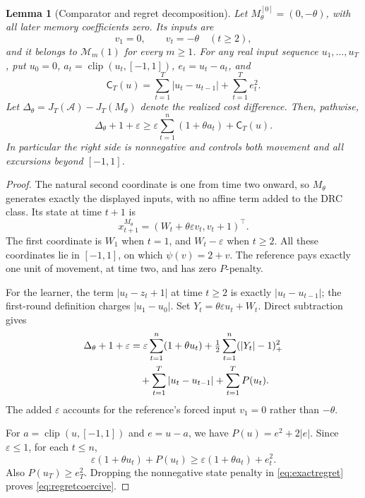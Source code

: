 \documentclass[11pt]{article}
\newtheorem{lemma}[theorem]{Lemma}
\theoremstyle{remark}
\newcommand{\clip}{\operatorname{clip}}
\newcommand{\cost}{\mathsf C}
\begin{document}
\begin{samepage}
\begin{lemma}[Comparator and regret decomposition]\label{lem:regret}
Let $M_\theta^{[0]}=(0,-\theta)$, with all later memory coefficients zero. Its inputs are
\[
 v_1=0,\qquad v_t=-\theta\quad(t\ge2),
\]
and it belongs to $\mathcal M_m(1)$ for every $m\ge1$. For any real input sequence $u_1,\ldots,u_T$, put $u_0=0$, $a_t=\clip(u_t,[-1,1])$, $e_t=u_t-a_t$, and
\[
 \cost_T(u)=\sum_{t=1}^T|u_t-u_{t-1}|+\sum_{t=1}^T e_t^2.
\]
Let $\Delta_\theta=J_T(\mathcal A)-J_T(M_\theta)$ denote the realized cost difference. Then, pathwise,
\begin{equation}\label{eq:regretcoercive}
 \Delta_\theta+1+\varepsilon
 \ge \varepsilon\sum_{t=1}^n(1+\theta a_t)+\cost_T(u).
\end{equation}
In particular the right side is nonnegative and controls both movement and all excursions beyond $[-1,1]$.
\end{lemma}
\end{samepage}
\begin{proof}
The natural second coordinate is one from time two onward, so $M_\theta$ generates exactly the displayed inputs, with no affine term added to the DRC class. Its state at time $t+1$ is
\[
 x_{t+1}^{M_\theta}=(W_t+\theta\varepsilon v_t,v_t+1)^\top.
\]
The first coordinate is $W_1$ when $t=1$, and $W_t-\varepsilon$ when $t\ge2$. All these coordinates lie in $[-1,1]$, on which $\psi(v)=2+v$. The reference pays exactly one unit of movement, at time two, and has zero $P$-penalty.

For the learner, the term $|u_t-z_t+1|$ at time $t\ge2$ is exactly $|u_t-u_{t-1}|$; the first-round definition charges $|u_1-u_0|$. Set $Y_t=\theta\varepsilon u_t+W_t$. Direct subtraction gives
\begin{align}
 \Delta_\theta+1+\varepsilon
 &=\varepsilon\sum_{t=1}^n(1+\theta u_t)
   +\tfrac12\sum_{t=1}^n(|Y_t|-1)_+^2\notag\\
 &\quad+\sum_{t=1}^T|u_t-u_{t-1}|+\sum_{t=1}^T P(u_t).
 \label{eq:exactregret}
\end{align}
The added $\varepsilon$ accounts for the reference's forced input $v_1=0$ rather than $-\theta$.

For $a=\clip(u,[-1,1])$ and $e=u-a$, we have $P(u)=e^2+2|e|$. Since $\varepsilon\le1$, for each $t\le n$,
\[
 \varepsilon(1+\theta u_t)+P(u_t)
 \ge\varepsilon(1+\theta a_t)+e_t^2.
\]
Also $P(u_T)\ge e_T^2$. Dropping the nonnegative state penalty in \eqref{eq:exactregret} proves \eqref{eq:regretcoercive}.
\end{proof}
\end{document}
